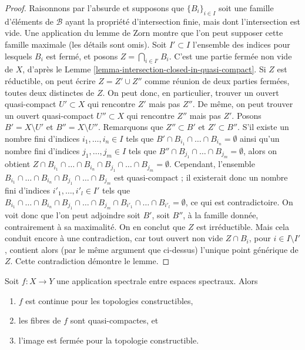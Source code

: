 \begin{proof}
\medskip\noindent
Raisonnons par l'absurde et supposons que $\{B_i\}_{i \in I}$ soit une famille
d'éléments de $\mathcal{B}$ ayant la propriété d'intersection finie, mais dont
l'intersection est vide. Une application du lemme de Zorn montre que l'on
peut supposer cette famille maximale (les détails sont omis).
Soit $I' \subset I$ l'ensemble des indices pour lesquels $B_i$ est fermé,
et posons $Z = \bigcap_{i \in I'} B_i$.
C'est une partie fermée non vide de $X$, d'après le Lemme
\ref{lemma-intersection-closed-in-quasi-compact}.
Si $Z$ est réductible, on peut écrire $Z = Z' \cup Z''$
comme réunion de deux parties fermées, toutes deux distinctes de $Z$. On peut
donc, en particulier, trouver un ouvert quasi-compact $U' \subset X$ qui
rencontre $Z'$ mais pas $Z''$. De même, on peut trouver un ouvert quasi-compact
$U'' \subset X$ qui rencontre $Z''$ mais pas $Z'$. Posons
$B' = X \setminus U'$ et $B'' = X \setminus U''$. Remarquons que
$Z'' \subset B'$ et $Z' \subset B''$.
S'il existe un nombre fini d'indices $i_1, \ldots, i_n \in I$ tels que
$B' \cap B_{i_1} \cap \ldots \cap B_{i_n} = \emptyset$
ainsi qu'un nombre fini d'indices $j_1, \ldots, j_m \in I$ tels que
$B'' \cap B_{j_1} \cap \ldots \cap B_{j_m} = \emptyset$,
alors on obtient
$Z \cap B_{i_1} \cap \ldots \cap B_{i_n} \cap B_{j_1} \cap \ldots \cap B_{j_m}
= \emptyset$.
Cependant, l'ensemble
$B_{i_1} \cap \ldots \cap B_{i_n} \cap B_{j_1} \cap \ldots \cap B_{j_m}$
est quasi-compact ; il existerait donc un nombre fini d'indices
$i'_1, \ldots, i'_l \in I'$ tels que
$B_{i_1} \cap \ldots \cap B_{i_n} \cap B_{j_1} \cap \ldots \cap
B_{j_m} \cap B_{i'_1} \cap \ldots \cap B_{i'_l} = \emptyset$, ce qui est
contradictoire. On voit donc que l'on peut adjoindre soit $B'$, soit $B''$,
à la famille donnée, contrairement à sa maximalité. On en conclut que $Z$
est irréductible. Mais cela conduit encore à une contradiction, car tout
ouvert non vide $Z \cap B_i$, pour $i \in I \setminus I'$, contient alors
(par le même argument que ci-dessus) l'unique point générique de $Z$.
Cette contradiction démontre le lemme.
\end{proof}

\begin{lemma}
\label{lemma-fibres-spectral-map-quasi-compact}
Soit $f : X \to Y$ une application spectrale entre espaces spectraux. Alors
\begin{enumerate}
\item $f$ est continue pour les topologies constructibles,
\item les fibres de $f$ sont quasi-compactes, et
\item l'image est fermée pour la topologie constructible.
\end{enumerate}
\end{lemma}

